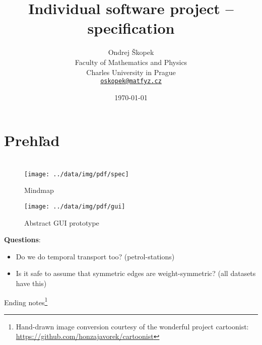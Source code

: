 \documentclass[12pt,a4paper,oneside]{article}
\author{Ondrej Škopek\\
Faculty of Mathematics and Physics\\
Charles University in Prague\\
\texttt{\href{mailto:oskopek@matfyz.cz}{oskopek@matfyz.cz}}}
\title{Individual software project -- specification}
\date{\today}
\begin{document}
\maketitle

\begin{abstract}
\end{abstract}

\section{Prehľad}
\section{}

\FloatBarrier
\begin{figure}
        \centering
        \texttt{[image: ../data/img/pdf/spec]}
        \caption{Mindmap}
        \label{fig:mindmap}
\end{figure}
\begin{figure}
        \centering
        \texttt{[image: ../data/img/pdf/gui]}
        \caption{Abstract GUI prototype}
        \label{fig:gui}
\end{figure}

\FloatBarrier


\textbf{Questions}:
\begin{itemize}
    \item Do we do temporal transport too? (petrol-stations)
    \item Is it safe to assume that symmetric edges are weight-symmetric? (all datasets have this)
\end{itemize}

Ending notes\footnote{Hand-drawn image conversion courtesy of the wonderful project cartoonist: \url{https://github.com/honzajavorek/cartoonist}}
\end{document}
